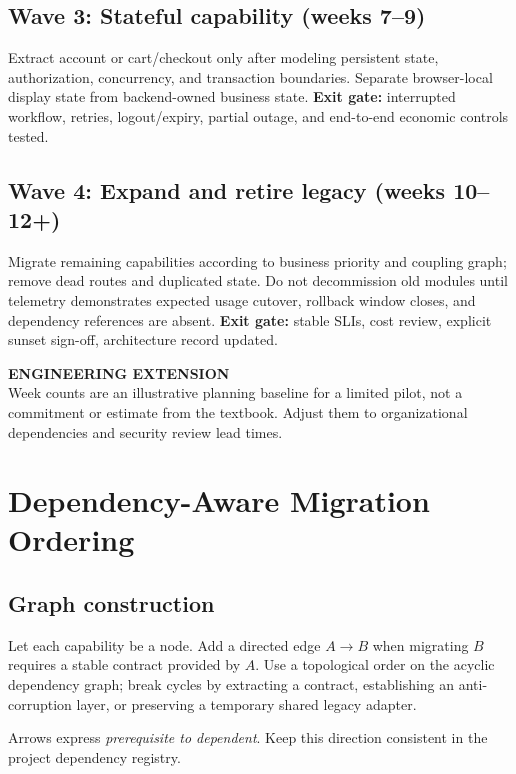 \documentclass[11pt,letterpaper,oneside]{report}
\newcommand{\added}[1]{\begin{engineerbox}\textbf{ENGINEERING EXTENSION}\\#1\end{engineerbox}}
\begin{document}
\section{Wave 3: Stateful capability (weeks 7--9)}
Extract account or cart/checkout only after modeling persistent state, authorization, concurrency, and transaction boundaries. Separate browser-local display state from backend-owned business state. \textbf{Exit gate:} interrupted workflow, retries, logout/expiry, partial outage, and end-to-end economic controls tested.
\section{Wave 4: Expand and retire legacy (weeks 10--12+)}
Migrate remaining capabilities according to business priority and coupling graph; remove dead routes and duplicated state. Do not decommission old modules until telemetry demonstrates expected usage cutover, rollback window closes, and dependency references are absent. \textbf{Exit gate:} stable SLIs, cost review, explicit sunset sign-off, architecture record updated.
\added{Week counts are an illustrative planning baseline for a limited pilot, not a commitment or estimate from the textbook. Adjust them to organizational dependencies and security review lead times.}
\chapter{Dependency-Aware Migration Ordering}
\section{Graph construction}
Let each capability be a node. Add a directed edge $A\rightarrow B$ when migrating $B$ requires a stable contract provided by $A$. Use a topological order on the acyclic dependency graph; break cycles by extracting a contract, establishing an anti-corruption layer, or preserving a temporary shared legacy adapter.
\begin{center}\end{center}
\noindent Arrows express \emph{prerequisite to dependent}. Keep this direction consistent in the project dependency registry.
\end{document}
